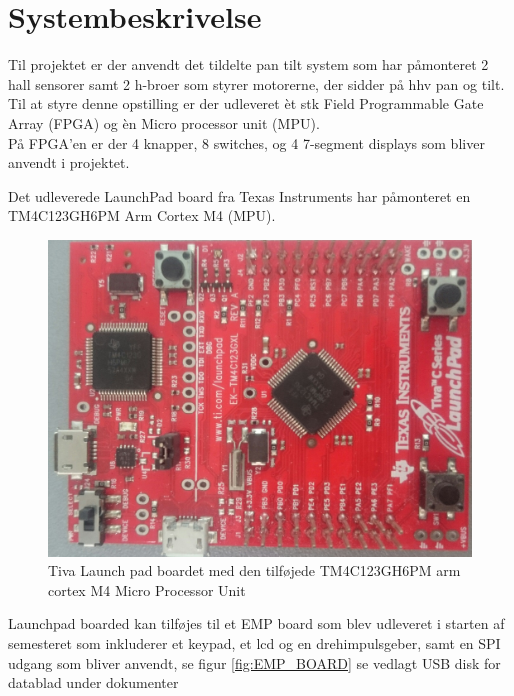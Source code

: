 \section{Systembeskrivelse}
Til projektet er der anvendt det tildelte pan tilt system som har påmonteret 2 hall sensorer samt 2 h-broer som styrer motorerne, der sidder på hhv pan og tilt.\\
Til at styre denne opstilling er der udleveret èt stk Field Programmable Gate Array (FPGA) og èn Micro processor unit (MPU).
\\
På FPGA'en \cite{Nexys2Datasheet} er der 4 knapper, 8 switches, og 4 7-segment displays som bliver anvendt i projektet.

Det udleverede LaunchPad board fra Texas Instruments har påmonteret en TM4C123GH6PM Arm Cortex M4 (MPU)\cite{TM4C123GH6PMDatasheet}.

\begin{figure}[!ht]
	\begin{center}
		\includegraphics[scale=0.1, angle =270]{Billeder/TivaLaunchPad.JPG}
	\end{center}
\caption{Tiva Launch pad boardet med den tilføjede TM4C123GH6PM arm cortex M4 Micro Processor Unit}
\label{fig:TivaLaunchPad}
\end{figure}

Launchpad boarded kan tilføjes til et EMP board som blev udleveret i starten af semesteret som inkluderer et keypad, et lcd og en drehimpulsgeber, samt en SPI udgang som bliver anvendt, se figur \ref{fig:EMP_BOARD} se vedlagt USB disk for datablad under dokumenter

